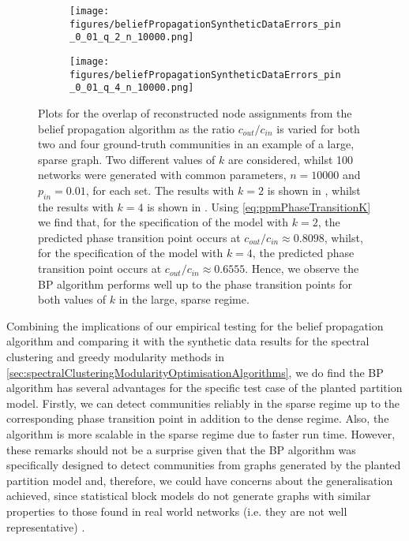 \begin{figure}
\centering
	\begin{subfigure}{.5\textwidth}
		\centering
		\texttt{[image: figures/beliefPropagationSyntheticDataErrors\_pin\_0\_01\_q\_2\_n\_10000.png]}
		\caption{}
		\label{fig:BPAlgorithmResultsLargeNetwork_k_2}
	\end{subfigure}%
	\begin{subfigure}{.5\textwidth}
		\centering
		\texttt{[image: figures/beliefPropagationSyntheticDataErrors\_pin\_0\_01\_q\_4\_n\_10000.png]}
		\caption{}
		\label{fig:BPAlgorithmResultsLargeNetwork_k_4}
	\end{subfigure}
	\caption[Plot of overlap for belief propagation algorithm on large network for two and four ground-truth communities.]{\label{fig:BPAlgorithmResultsLargeNetwork} Plots for the overlap of reconstructed node assignments from the belief propagation algorithm as the ratio $c_{out}/c_{in}$ is varied for both two and four ground-truth communities in an example of a large, sparse graph. Two different values of $k$ are considered, whilst 100 networks were generated with common parameters, $n = 10000$ and $p_{in} = 0.01$, for each set. The results with $k = 2$ is shown in , whilst the results with $k = 4$ is shown in . Using \cref{eq:ppmPhaseTransitionK} we find that, for the specification of the model with $k=2$, the predicted phase transition point occurs at $c_{out}/c_{in} \approx 0.8098$, whilst, for the specification of the model with $k=4$, the predicted phase transition point occurs at $c_{out}/c_{in} \approx 0.6555$. Hence, we observe the BP algorithm performs well up to the phase transition points for both values of $k$ in the large, sparse regime.}
\end{figure}

Combining the implications of our empirical testing for the belief propagation algorithm and comparing it with the synthetic data results for the spectral clustering and greedy modularity methods in \cref{sec:spectralClusteringModularityOptimisationAlgorithms}, we do find the BP algorithm has several advantages for the specific test case of the planted partition model.
Firstly, we can detect communities reliably in the sparse regime up to the corresponding phase transition point in addition to the dense regime.
Also, the algorithm is more scalable in the sparse regime due to faster run time.
However, these remarks should not be a surprise given that the BP algorithm was specifically designed to detect communities from graphs generated by the planted partition model and, therefore, we could have concerns about the generalisation achieved, since statistical block models do not generate graphs with similar properties to those found in real world networks (i.e. they are not well representative) \cite{DKM+13}.

